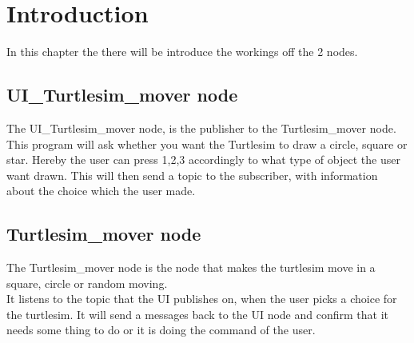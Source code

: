 \chapter{Introduction}\label{ch:introduction}

In this chapter the there will be introduce the workings off the 2 nodes.

\section{UI\_Turtlesim\_mover node}

The UI\_Turtlesim\_mover node, is the publisher to the Turtlesim\_mover node.\\
This program will ask whether you want the Turtlesim to draw a circle, square or star. Hereby the user can press 1,2,3 accordingly to what type of object the user want drawn. This will then send a topic to the subscriber, with information about the choice which the user made.\\


\section{Turtlesim\_mover node}


The Turtlesim\_mover node is the node that makes the turtlesim move in a square, circle or random moving.\\
It listens to the topic that the UI publishes on, when the user picks a choice for the turtlesim.
It will send a messages back to the UI node and confirm that it needs some thing to do or it is doing the command of the user.\\